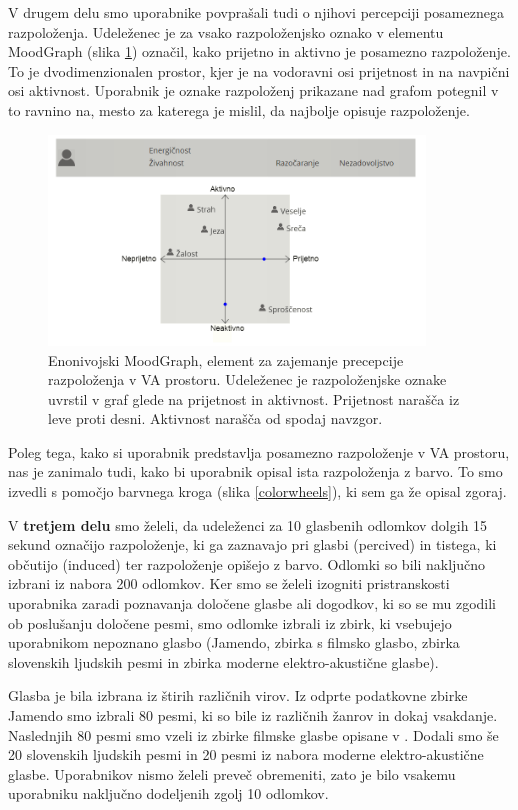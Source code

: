 \documentclass[a4paper, 12pt]{book}
\begin{document}
{V drugem delu smo uporabnike povprašali tudi o njihovi percepciji posameznega razpoloženja. Udeleženec je za vsako razpoloženjsko oznako v elementu MoodGraph (slika \ref{moodgraph}) označil, kako prijetno in aktivno je posamezno razpoloženje. To je dvodimenzionalen prostor, kjer je na vodoravni osi prijetnost in na navpični osi aktivnost. Uporabnik je oznake razpoloženj prikazane nad grafom potegnil v to ravnino na, mesto za katerega je mislil, da najbolje opisuje razpoloženje. 

\begin{figure}[ht]
\centering
\includegraphics[width=10cm]{images/enomoodgraph.png}

\caption{Enonivojski MoodGraph, element za zajemanje precepcije razpoloženja v VA prostoru. Udeleženec je razpoloženjske oznake uvrstil v graf glede na prijetnost in aktivnost. Prijetnost narašča iz leve proti desni. Aktivnost narašča od spodaj navzgor. }
\label{moodgraph}
\end{figure}

Poleg tega, kako si uporabnik predstavlja posamezno razpoloženje v VA prostoru, nas je zanimalo tudi, kako bi uporabnik opisal ista razpoloženja z barvo. To smo izvedli s pomočjo barvnega kroga (slika \ref{colorwheels}), ki sem ga že opisal zgoraj. 

V \textbf{tretjem delu} smo želeli, da udeleženci za 10 glasbenih odlomkov dolgih 15 sekund označijo razpoloženje, ki ga zaznavajo pri glasbi (percived) in tistega, ki občutijo (induced) ter razpoloženje opišejo z barvo. Odlomki so bili naključno izbrani iz nabora 200 odlomkov. Ker smo se želeli izogniti pristranskosti uporabnika zaradi poznavanja določene glasbe ali dogodkov, ki so se mu zgodili ob poslušanju določene pesmi, smo odlomke izbrali iz zbirk, ki vsebujejo uporabnikom nepoznano glasbo (Jamendo, zbirka s filmsko glasbo, zbirka slovenskih ljudskih pesmi in zbirka moderne elektro-akustične glasbe).  

Glasba je bila izbrana iz štirih različnih virov. Iz odprte podatkovne zbirke Jamendo smo izbrali 80 pesmi, ki so bile iz različnih žanrov in dokaj vsakdanje. Naslednjih 80 pesmi smo vzeli iz zbirke filmske glasbe opisane v \cite{Eerola2010}. Dodali smo še 20 slovenskih ljudskih pesmi in 20 pesmi iz nabora moderne elektro-akustične glasbe. Uporabnikov nismo želeli preveč obremeniti, zato je bilo vsakemu uporabniku naključno dodeljenih zgolj 10 odlomkov.

}
\end{document}
